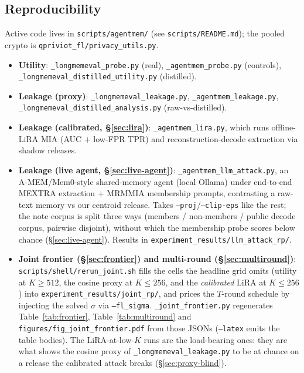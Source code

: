 \documentclass[pdflatex,sn-mathphys-num,iicol]{sn-jnl}
\theoremstyle{thmstyleone}%
\theoremstyle{thmstyletwo}%
\theoremstyle{thmstylethree}%
\newcommand{\secref}[1]{\S\ref{#1}}
\begin{document}
\begin{appendices}

\section{Reproducibility}\label{sec:repro}

Active code lives in \texttt{scripts/agentmem/} (see \texttt{scripts/README.md}); the pooled crypto is
\texttt{qpriviot\_fl/privacy\_utils.py}.

\begin{itemize}
  \item \textbf{Utility}: \texttt{\_longmemeval\_probe.py} (real),
    \texttt{\_agentmem\_probe.py} (controls),
    \texttt{\_longmemeval\_distilled\_utility.py} (distilled).
  \item \textbf{Leakage (proxy)}: \texttt{\_longmemeval\_leakage.py},
    \texttt{\_agentmem\_leakage.py}, \texttt{\_longmemeval\_distilled\_analysis.py}
    (raw-vs-distilled).
  \item \textbf{Leakage (calibrated, \secref{sec:lira})}: \texttt{\_agentmem\_lira.py}, which runs
    offline-LiRA MIA (AUC $+$ low-FPR TPR) and reconstruction-decode extraction via shadow releases.
  \item \textbf{Leakage (live agent, \secref{sec:live-agent})}: \texttt{\_agentmem\_llm\_attack.py},
    an A-MEM/Mem0-style shared-memory agent (local Ollama) under end-to-end MEXTRA extraction $+$
    MRMMIA membership prompts, contrasting a raw-text memory vs our centroid release. Takes
    \texttt{--proj}/\texttt{--clip-eps} like the rest; the note corpus is split three ways (members /
    non-members / public decode corpus, pairwise disjoint), without which the membership probe scores
    below chance (\secref{sec:live-agent}). Results in \texttt{experiment\_results/llm\_attack\_rp/}.
  \item \textbf{Joint frontier (\secref{sec:frontier}) and multi-round (\secref{sec:multiround})}:
    \texttt{scripts/shell/rerun\_joint.sh} fills the cells the headline grid omits (utility at
    $K \geq 512$, the cosine proxy at $K \leq 256$, and the \emph{calibrated} LiRA at
    $K \leq 256$) into \texttt{experiment\_results/joint\_rp/}, and prices the $T$-round
    schedule by injecting the solved $\sigma$ via \texttt{--fl\_sigma}.
    \texttt{\_joint\_frontier.py} regenerates Table~\ref{tab:frontier},
    Table~\ref{tab:multiround} and \texttt{figures/fig\_joint\_frontier.pdf} from those JSONs
    (\texttt{--latex} emits the table bodies). The LiRA-at-low-$K$ runs are the load-bearing
    ones: they are what shows the cosine proxy of \texttt{\_longmemeval\_leakage.py} to be at
    chance on a release the calibrated attack breaks (\secref{sec:proxy-blind}).


\end{itemize}
\end{appendices}
\end{document}
